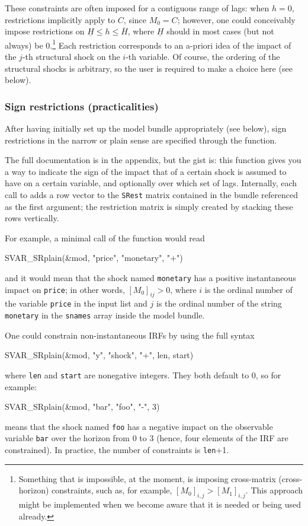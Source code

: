 \documentclass[a4paper,10pt]{article}
\newcommand{\dtk}[1]{\texttt{\detokenize{#1}}}
\begin{document}
These constraints are often imposed for a contiguous range of lags:
when $h=0$, restrictions implicitly apply to $C$, since $M_0 = C$;
however, one could conceivably impose restrictions on
$\underline{H} \le h \le \overline{H}$, where $\underline{H}$ should
in most cases (but not always) be 0.\footnote{Something that is impossible,
  at the moment, is imposing cross-matrix (cross-horizon) constraints, such 
  as, for example, $[M_0]_{i,j} > [M_1]_{i,j}$. This approach might be 
  implemented when we become aware that it is needed or being used 
  already.} Each restriction corresponds to an
a-priori idea of the impact of the $j$-th structural shock on the
$i$-th variable. Of course, the ordering of the structural shocks is
arbitrary, so the user is required to make a choice here (see below).

\subsubsection{Sign restrictions (practicalities)}

After having initially set up the model bundle appropriately (see
below), sign restrictions in the narrow or plain sense are specified
through the \dtk{SVAR_SRplain} function.

The full documentation is in the appendix, but the gist is: this
function gives you a way to indicate the sign of the impact that of a
certain shock is assumed to have on a certain variable, and optionally
over which set of lags. Internally, each call to
\dtk{SVAR_SRplain} adds a row vector to the \texttt{SRest} matrix
contained in the bundle referenced as the first argument; the
restriction matrix is simply created by stacking these rows
vertically.

For example, a minimal call of the function would read
\begin{code}
  SVAR_SRplain(&mod, "price", "monetary", "+")
\end{code}
and it would mean that the shock named \texttt{monetary} has a
positive instantaneous impact on \texttt{price}; in other words,
$[M_0]_{ij} > 0$, where $i$ is the ordinal number of the variable
\texttt{price} in the input list and $j$ is the ordinal number of the
string \texttt{monetary} in the \texttt{snames} array inside the model
bundle.

One could constrain non-instantaneous IRFs by using the full syntax
\begin{code}
SVAR_SRplain(&mod, "y", "shock", "+", len, start)
\end{code}
where \texttt{len} and \texttt{start} are nonegative integers. They
both default to 0, so for example:
\begin{code}
SVAR_SRplain(&mod, "bar", "foo", "-", 3)
\end{code}
means that the shock named \texttt{foo} has a negative impact on the
observable variable \texttt{bar} over the horizon from 0 to 3 (hence,
four elements of the IRF are constrained). In practice, the number of
constraints is \texttt{len}+1. 
\end{document}
